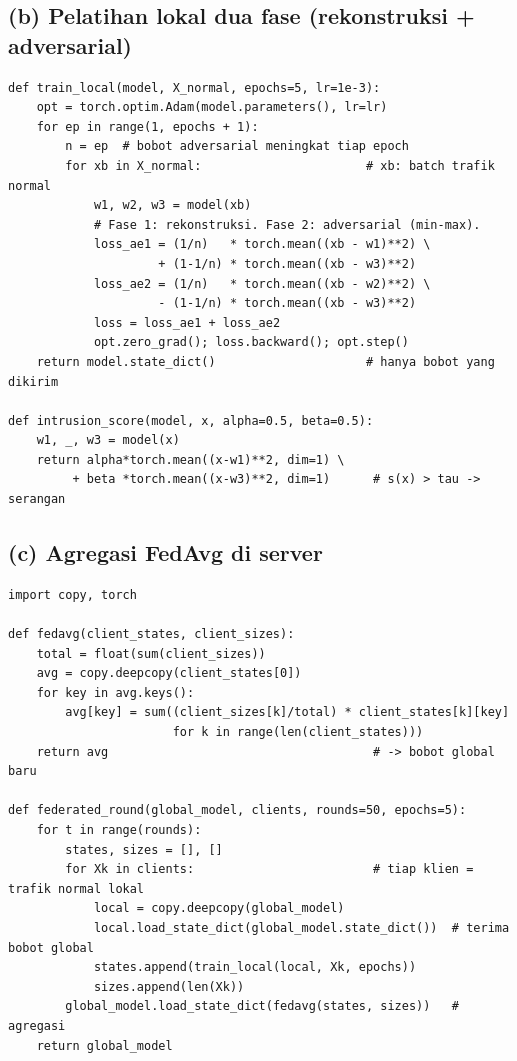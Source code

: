 \documentclass[11pt,a4paper]{article}
\begin{document}
\subsection{(b) Pelatihan lokal dua fase (rekonstruksi + adversarial)}
\begin{lstlisting}[style=py,caption={Satu klien melatih USAD pada trafik normal lokal.}]
def train_local(model, X_normal, epochs=5, lr=1e-3):
    opt = torch.optim.Adam(model.parameters(), lr=lr)
    for ep in range(1, epochs + 1):
        n = ep  # bobot adversarial meningkat tiap epoch
        for xb in X_normal:                       # xb: batch trafik normal
            w1, w2, w3 = model(xb)
            # Fase 1: rekonstruksi. Fase 2: adversarial (min-max).
            loss_ae1 = (1/n)   * torch.mean((xb - w1)**2) \
                     + (1-1/n) * torch.mean((xb - w3)**2)
            loss_ae2 = (1/n)   * torch.mean((xb - w2)**2) \
                     - (1-1/n) * torch.mean((xb - w3)**2)
            loss = loss_ae1 + loss_ae2
            opt.zero_grad(); loss.backward(); opt.step()
    return model.state_dict()                     # hanya bobot yang dikirim

def intrusion_score(model, x, alpha=0.5, beta=0.5):
    w1, _, w3 = model(x)
    return alpha*torch.mean((x-w1)**2, dim=1) \
         + beta *torch.mean((x-w3)**2, dim=1)      # s(x) > tau -> serangan
\end{lstlisting}

\subsection{(c) Agregasi FedAvg di server}
\begin{lstlisting}[style=py,caption={Rata-rata berbobot ukuran data (FedAvg).}]
import copy, torch

def fedavg(client_states, client_sizes):
    total = float(sum(client_sizes))
    avg = copy.deepcopy(client_states[0])
    for key in avg.keys():
        avg[key] = sum((client_sizes[k]/total) * client_states[k][key]
                       for k in range(len(client_states)))
    return avg                                     # -> bobot global baru

def federated_round(global_model, clients, rounds=50, epochs=5):
    for t in range(rounds):
        states, sizes = [], []
        for Xk in clients:                         # tiap klien = trafik normal lokal
            local = copy.deepcopy(global_model)
            local.load_state_dict(global_model.state_dict())  # terima bobot global
            states.append(train_local(local, Xk, epochs))
            sizes.append(len(Xk))
        global_model.load_state_dict(fedavg(states, sizes))   # agregasi
    return global_model
\end{lstlisting}
\end{document}
